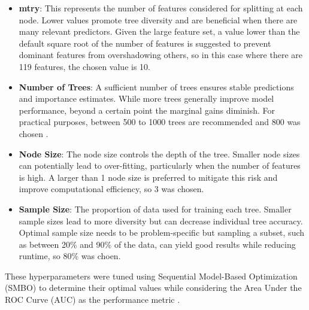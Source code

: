 \begin{itemize}
  \item \textbf{mtry}: This represents the number of features considered for splitting at each node. Lower values promote tree diversity and are beneficial when there are many relevant predictors. Given the large feature set, a value lower than the default square root of the number of features is suggested to prevent dominant features from overshadowing others, so in this case where there are 119 features, the chosen value is 10.
  \item \textbf{Number of Trees}: A sufficient number of trees ensures stable predictions and importance estimates. While more trees generally improve model performance, beyond a certain point the marginal gains diminish. For practical purposes, between 500 to 1000 trees are recommended and 800 was chosen .
  \item \textbf{Node Size}: The node size controls the depth of the tree. Smaller node sizes can potentially lead to over-fitting, particularly when the number of features is high. A larger than 1 node size is preferred to mitigate this risk and improve computational efficiency, so 3 was chosen.
  \item \textbf{Sample Size}: The proportion of data used for training each tree. Smaller sample sizes lead to more diversity but can decrease individual tree accuracy. Optimal sample size needs to be problem-specific but sampling a subset, such as between 20\% and 90\% of the data, can yield good results while reducing runtime, so 80\% was choen. 
\end{itemize}

These hyperparameters were tuned using Sequential Model-Based Optimization (SMBO) to determine their optimal values while considering the Area Under the ROC Curve (AUC) as the performance metric \cite{probst2019hyperparameters}.







